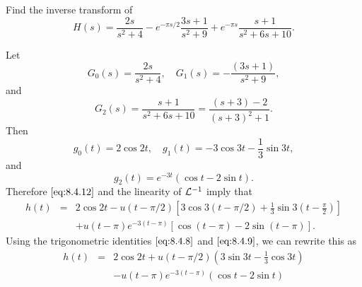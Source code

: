 \documentclass{ximera}
\begin{document}
\begin{example}\label{example:8.4.8}
 Find the inverse transform of
$$
H(s)=\frac{2s}{s^2+4}-e^{-\pi s/2} \frac{3s+1}{s^2+9}+e^{-\pi
s}\frac{s+1}{s^2+6s+10}.
$$
\begin{explanation}
Let
$$
G_0(s)=\frac{2s}{s^2+4},\quad G_1(s)=-\frac{(3s+1)}{s^2+9},
$$
and
$$
G_2(s)=\frac{s+1}{s^2+6s+10}=\frac{(s+3)-2}{(s+3)^2+1}.
$$
Then
$$
g_0(t)=2\cos 2t,\quad g_1(t)=-3\cos 3t-\frac{1}{3}\sin 3t,
$$
and
$$
g_2(t)=e^{-3t}(\cos t-2\sin t).
$$
Therefore $\eqref{eq:8.4.12}$ and the linearity of ${\cal L}^{-1}$
imply that
\begin{eqnarray*}
h(t)&=&2\cos 2t-u(t-\pi/2)\left[3\cos
3(t-\pi/2)+\frac{1}{3}\sin 3\left(t-\frac{\pi}{2}\right)\right]\\
&&+u(t-\pi)e^{-3(t-\pi)}\left[\cos (t-\pi)-2\sin (t-\pi)\right].
\end{eqnarray*}
Using the trigonometric identities $\eqref{eq:8.4.8}$ and
$\eqref{eq:8.4.9}$, we can rewrite this as
\begin{equation} \label{eq:8.4.13}
\begin{array}{rcl}
h(t)&=&2\cos 2t+u(t-\pi/2)\left(3\sin 3t-
\frac{1}{3}\cos 3t\right)\\
&&-u(t-\pi)e^{-3(t-\pi)} (\cos t-2\sin t)
\end{array}
\end{equation}

\begin{center}
\end{center}




\end{explanation}
\end{example}
\end{document}
